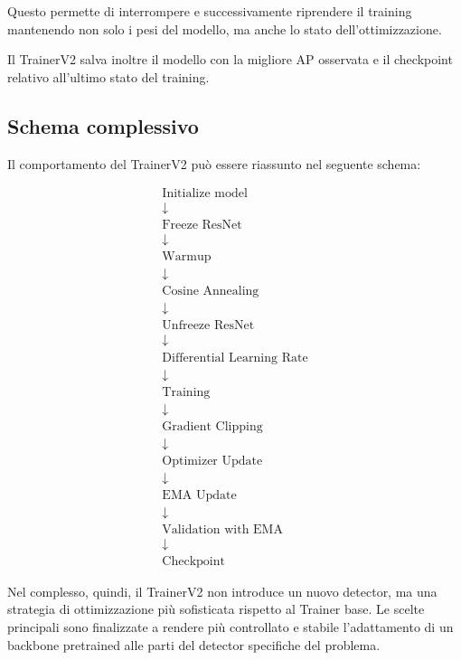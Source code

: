 Questo permette di interrompere e successivamente riprendere il training
mantenendo non solo i pesi del modello, ma anche lo stato dell'ottimizzazione.

Il TrainerV2 salva inoltre il modello con la migliore AP osservata e il
checkpoint relativo all'ultimo stato del training.

\subsection{Schema complessivo}

Il comportamento del TrainerV2 può essere riassunto nel seguente schema:

\[
\boxed{
\begin{array}{c}
\text{Initialize model} \\
\downarrow \\
\text{Freeze ResNet} \\
\downarrow \\
\text{Warmup} \\
\downarrow \\
\text{Cosine Annealing} \\
\downarrow \\
\text{Unfreeze ResNet} \\
\downarrow \\
\text{Differential Learning Rate} \\
\downarrow \\
\text{Training} \\
\downarrow \\
\text{Gradient Clipping} \\
\downarrow \\
\text{Optimizer Update} \\
\downarrow \\
\text{EMA Update} \\
\downarrow \\
\text{Validation with EMA} \\
\downarrow \\
\text{Checkpoint}
\end{array}
}
\]

Nel complesso, quindi, il TrainerV2 non introduce un nuovo detector, ma una
strategia di ottimizzazione più sofisticata rispetto al Trainer base. Le
scelte principali sono finalizzate a rendere più controllato e stabile
l'adattamento di un backbone pretrained alle parti del detector specifiche del
problema.